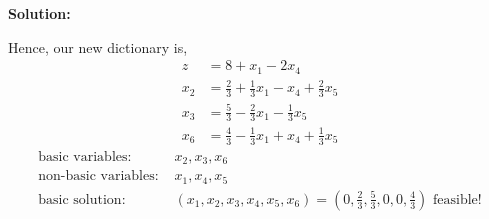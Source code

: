 \documentclass[11pt]{article}
\newenvironment{solution}
  {\par\noindent\textbf{Solution:}\par}
  {\par}
\begin{document}
\begin{solution}
Hence, our new dictionary is,
  \[
  \begin{aligned}
    z &=  8 +x_1 -2x_4 \\
    x_2 &= \frac{2}{3} +\frac{1}{3} x_1 -x_4 + \frac{2}{3}x_5 \\ 
    x_3 &= \frac{5}{3} -\frac{2}{3}x_1 - \frac{1}{3}x_5 \\
    x_6 &= \frac{4}{3} -\frac{1}{3}x_1 +x_4 + \frac{1}{3}x_5
  \end{aligned}
  \]
\[
  \begin{aligned}
    \text{basic variables: } &x_2,x_3,x_6 \\ 
    \text{non-basic variables: } &x_1,x_4,x_5 \\ 
    \text{basic solution: } &(x_1,x_2,x_3,x_4,x_5,x_6) = (0,\frac{2}{3},\frac{5}{3},0,0,\frac{4}{3}) \text{ feasible!}
  \end{aligned}
\]


\end{solution}
\end{document}
